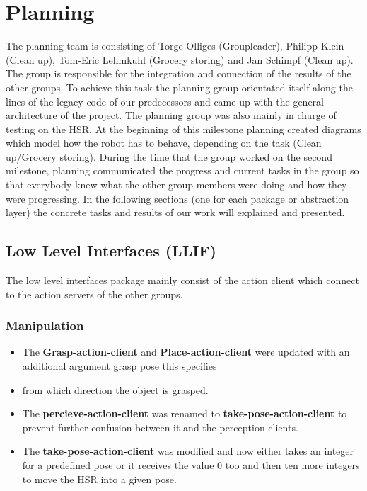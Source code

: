 \documentclass[main.tex]{subfiles}
\begin{document}
	
	\chapter{Planning}
		
                The planning team is consisting of Torge Olliges (Groupleader), Philipp Klein (Clean up), Tom-Eric Lehmkuhl (Grocery storing) and Jan Schimpf (Clean up). The group is responsible for the integration and connection of the results of the other groups. To achieve this task the planning group orientated itself along the lines of the legacy code of our predecessors and came up with the general architecture of the project. The planning group was also mainly in charge of testing on the HSR. At the beginning of this milestone planning created diagrams which model how the robot has to behave, depending on the task (Clean up/Grocery storing). During the time that the group worked on the second milestone, planning communicated the progress and current tasks in the group so that everybody knew what the other group members were doing and how they were progressing. In the following sections (one for each package or abstraction layer) the concrete tasks and results of our work will explained and presented.
		
                \section{Low Level Interfaces (LLIF)}
	                The low level interfaces package mainly consist of the action client which connect to the action servers of the other groups.
                
                \subsection{Manipulation}
	                \begin{itemize}
						\item The \textbf{Grasp-action-client} and \textbf{Place-action-client} were updated with an additional argument grasp pose this specifies \item from which direction the object is grasped.
						\item The \textbf{percieve-action-client} was renamed to \textbf{take-pose-action-client} to prevent further confusion between it and the perception clients.
						\item The \textbf{take-pose-action-client} was modified and now either takes an integer for a predefined pose or it receives the value 0 too and then ten more integers to move the HSR into a given pose.
					\end{itemize}
\end{document}
